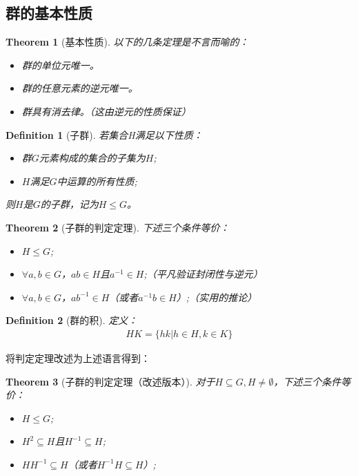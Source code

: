 \documentclass[12pt,a4paper,UTF8]{ctexbook}
\theoremstyle{plain}
\newtheorem{theorem}{\indent Theorem}[section]
\newtheorem{definition}{\indent Definition}[section]
\begin{document}
\subsection{群的基本性质}
\begin{theorem}[基本性质]
    以下的几条定理是不言而喻的：
    \begin{itemize}
        \item 群的单位元唯一。
        \item 群的任意元素的逆元唯一。
        \item 群具有消去律。（这由逆元的性质保证）
    \end{itemize}
\end{theorem}
\begin{definition}[子群]
    若集合H满足以下性质：
    \begin{itemize}
        \item 群$G$元素构成的集合的子集为$H$;
        \item $H$满足$G$中运算的所有性质;
    \end{itemize}
    则$H$是$G$的子群，记为$H\leq G$。
\end{definition}
\begin{theorem}[子群的判定定理]
    下述三个条件等价：
    \begin{itemize}
        \item $H\leq G$;
        \item $\forall a,b\in G$，$ab\in H$且$a^{-1}\in H$;（平凡验证封闭性与逆元）
        \item $\forall a,b\in G$，$ab^{-1}\in H$（或者$a^{-1}b\in H$）;（实用的推论）
    \end{itemize}
\end{theorem}
\begin{definition}[群的积]
    定义： 
    \begin{align*} 
        HK = \{hk|h\in H, k\in K\}
    \end{align*} 
\end{definition}
将判定定理改述为上述语言得到：
\begin{theorem}[子群的判定定理（改述版本）]
    对于$H \subseteq G, H\ne \emptyset$，下述三个条件等价：
    \begin{itemize}
        \item $H\leq G$;
        \item $H^2 \subseteq H$且$H^{-1}\subseteq H$;
        \item $HH^{-1}\subseteq H$（或者$H^{-1}H\subseteq H$）;
    \end{itemize}
\end{theorem}
\end{document}
